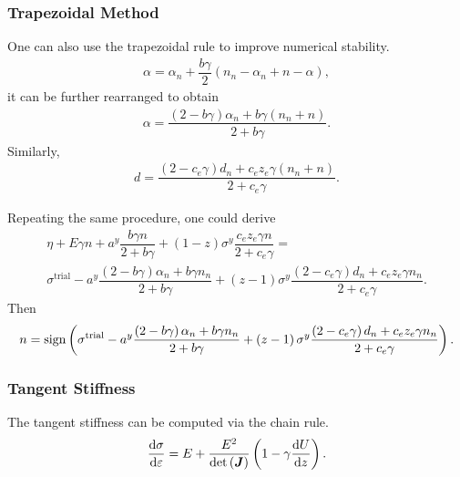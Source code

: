 \subsubsection{Trapezoidal Method}
One can also use the trapezoidal rule to improve numerical stability.
\begin{gather}
\alpha=\alpha_n+\dfrac{b\gamma}{2}\left(n_n-\alpha_n+n-\alpha\right),
\end{gather}
it can be further rearranged to obtain
\begin{gather}
\alpha=\dfrac{\left(2-b\gamma\right)\alpha_n+b\gamma{}\left(n_n+n\right)}{2+b\gamma}.
\end{gather}
Similarly,
\begin{gather}
d=\dfrac{\left(2-c_e\gamma\right)d_n+c_ez_e\gamma{}\left(n_n+n\right)}{2+c_e\gamma}.
\end{gather}

Repeating the same procedure, one could derive
\begin{multline}
\eta+E\gamma{}n+a^y\dfrac{b\gamma{}n}{2+b\gamma}+\left(1-z\right)\sigma^y\dfrac{c_ez_e\gamma{}n}{2+c_e\gamma}=\\
\sigma^\text{trial}-a^y\dfrac{\left(2-b\gamma\right)\alpha_n+b\gamma{}n_n}{2+b\gamma}+\left(z-1\right)\sigma^y\dfrac{\left(2-c_e\gamma\right)d_n+c_ez_e\gamma{}n_n}{2+c_e\gamma}.
\end{multline}
Then
\begin{gather}
n=\text{sign}\left(\sigma^\text{trial}-a^y\dfrac{\left(2-b\gamma\right)\alpha_n+b\gamma{}n_n}{2+b\gamma}+\left(z-1\right)\sigma^y\dfrac{\left(2-c_e\gamma\right)d_n+c_ez_e\gamma{}n_n}{2+c_e\gamma}\right).
\end{gather}
\subsubsection{Tangent Stiffness}
The tangent stiffness can be computed via the chain rule.
\begin{gather}
\dfrac{\mathrm{d}\sigma}{\mathrm{d}\varepsilon}=E+\dfrac{E^2}{\det\left(\bm{J}\right)}\left(1-\gamma{}\dfrac{\mathrm{d}U}{\mathrm{d}z}\right).
\end{gather}

